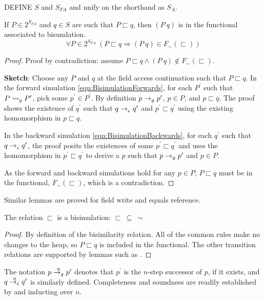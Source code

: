 DEFINE $S$ and $S_{FA}$ and unify on the shorthand as $S_A$. 
\begin{lemma}
If $P \in 2^{S_\mathit{FA}}$ and $q \in S$ are such that $P \sqsubset q$, then $(P\ q)$ is in the functional associated to bisumlation.
\label{lem:access}
$$
\forall P \in 2^{S_\mathit{FA}}\ (P \sqsubset q \Rightarrow (P\ q) \in F_\sim(\sqsubset))
$$
\end{lemma}

\begin{proof}
Proof by contradiction: assume $P \sqsubset q \wedge (P\ q) \not\in F_\sim(\sqsubset)$.

\noindent\textbf{Sketch}: Choose any $P$ and $q$ at the field access continuation such
that $P \sqsubset q$. In the forward simulation
\eqref{eqn:BisimulationForwards}, for each $P^\prime$ such that $P
\leadsto_{g} P^\prime$, pick some $p^\prime \in P^\prime$. By definition $p \rightarrow_{g}
p^\prime$, $p \in P$, and $p \sqsubset q$. The proof shows the
existence of $q^\prime$ such that $q \rightarrow_{\varsigma} q^\prime$ and $p^\prime
\sqsubset q^\prime$ using the existing homomorphism in $p \sqsubset q$.

In the backward simulation \eqref{eqn:BisimulationBackwards}, for each
$q^\prime$ such that $q \rightarrow_{\varsigma} q^\prime$, the proof posits the
existences of some $p^\prime \sqsubset q^\prime$ and uses the
homomorphism in $p^\prime \sqsubset q^\prime$ to derive a $p$ such
that $p \rightarrow_{g} p^\prime$ and $p \in P$.

As the forward and backward simulations hold for any $p \in P$, $P
\sqsubset q$ must be in the functional, $F_\sim(\sqsubset)$, which is
a contradiction.
\end{proof}
Similar lemmas are proved for field write and equals reference.

\begin{theorem}
\label{th:bisim}
The relation $\sqsubset$ is a bisimulation: $\sqsubset\ \subseteq\ \sim$
\end{theorem}
\begin{proof}
By definition of the bisimilarity relation. All of the common rules
make no changes to the heap, so $P \sqsubset q$ is included in the
functional. The other transition relations are supported by lemmas
such as .
\end{proof}

The notation $p \stackrel{n}{\rightarrow_{g}} p^\prime$ denotes that $p^\prime$ is
the $n$-step successor of $p$, if it exists, and $q
\stackrel{n}{\rightarrow_{\varsigma}} q^\prime$ is similarly defined. Completeness and
soundness are readily established by  and inducting
over $n$.

